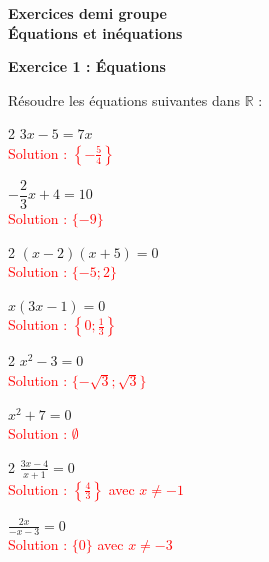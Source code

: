 \documentclass[12pt,a4paper]{exam}
\begin{document}
\begin{center}
    \Large\textbf{Exercices demi groupe\\Équations et inéquations}
\end{center}

\vspace{5pt}

\noindent
\textbf{Exercice 1 : Équations}

\vspace{5pt}
Résoudre les équations suivantes dans $\mathbb{R}$ :
\vspace{-5pt}
\begin{questions}
\begin{multicols}{2}
    \question $3x - 5 = 7x$
    \textcolor{red}{\\Solution : $\left\{-\frac{5}{4}\right\}$}

    \question $-\dfrac{2}{3}x + 4 = 10$
    \textcolor{red}{\\Solution : $\{-9\}$}
\end{multicols}
\vspace{5pt}
\begin{multicols}{2}
    \question $(x-2)(x+5)=0$
    \textcolor{red}{\\Solution : $\{-5; 2\}$}

    \question $x(3x-1)=0$
    \textcolor{red}{\\Solution : $\left\{0; \frac{1}{3}\right\}$}
\end{multicols}
\vspace{5pt}
\begin{multicols}{2}
    \question $x^2 -3 = 0$
    \textcolor{red}{\\Solution : $\{-\sqrt{3}; \sqrt{3}\}$}

    \question $x^2 + 7= 0$
    \textcolor{red}{\\Solution : $\emptyset$}
\end{multicols}
\vspace{5pt}
\begin{multicols}{2}
    \question $\displaystyle \frac{3x-4}{x+1}=0$
    \textcolor{red}{\\Solution : $\left\{\frac{4}{3}\right\}$ avec $x \neq -1$}

    \question $\displaystyle \frac{2x}{-x-3}=0$
    \textcolor{red}{\\Solution : $\{0\}$ avec $x \neq -3$}
\end{multicols}
\end{questions}
\end{document}
